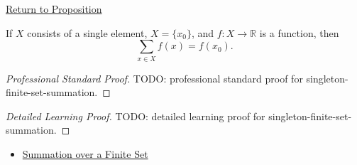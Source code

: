 \newpage
{}
\label{prf:singleton-finite-set-summation}

\begin{remark*}[Return]
\hyperref[prop:singleton-finite-set-summation]{Return to Proposition}
\end{remark*}

\begin{proposition*}
If \(X\) consists of a single element, \(X=\{x_0\}\), and
\(f:X\to\mathbb{R}\) is a function, then
\[
  \sum_{x\in X} f(x)=f(x_0).
\]
\end{proposition*}

\begin{proof}[Professional Standard Proof]
\LRAProofBodyStart
TODO: professional standard proof for singleton-finite-set-summation.
\end{proof}

\begin{proof}[Detailed Learning Proof]
\LRAProofBodyStart
TODO: detailed learning proof for singleton-finite-set-summation.
\end{proof}

\begin{remark*}
\end{remark*}

\begin{dependencies}
\begin{itemize}
  \item \hyperref[def:summation-over-finite-set]{Summation over a Finite Set}
\end{itemize}
\end{dependencies}

\clearpage
